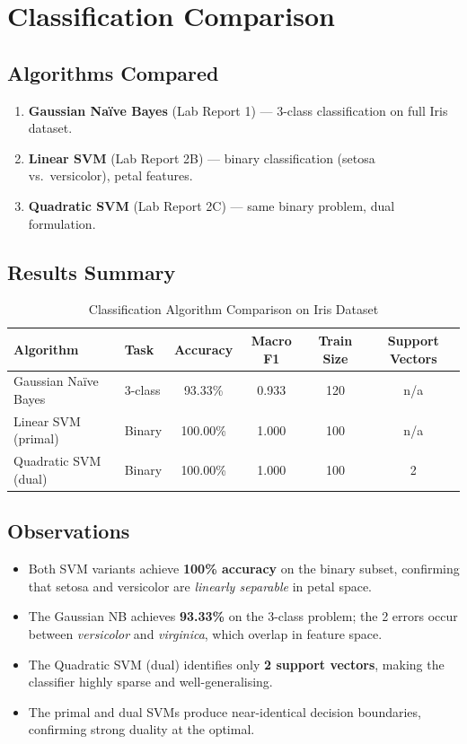 \documentclass[12pt,a4paper]{article}
\begin{document}
\section{Classification Comparison}

\subsection{Algorithms Compared}

\begin{enumerate}[label=\arabic*.]
  \item \textbf{Gaussian Naïve Bayes} (Lab Report 1) — 3-class classification on full Iris dataset.
  \item \textbf{Linear SVM} (Lab Report 2B) — binary classification (setosa vs.\ versicolor), petal features.
  \item \textbf{Quadratic SVM} (Lab Report 2C) — same binary problem, dual formulation.
\end{enumerate}

\subsection{Results Summary}

\begin{table}[H]
\centering
\caption{Classification Algorithm Comparison on Iris Dataset}
\begin{tabular}{l l c c c c}
\toprule
\textbf{Algorithm} & \textbf{Task} & \textbf{Accuracy} & \textbf{Macro F1} & \textbf{Train Size} & \textbf{Support Vectors} \\
\midrule
Gaussian Naïve Bayes & 3-class & 93.33\% & 0.933 & 120 & n/a \\
Linear SVM (primal)  & Binary  & 100.00\% & 1.000 & 100 & n/a \\
Quadratic SVM (dual) & Binary  & 100.00\% & 1.000 & 100 & 2   \\
\bottomrule
\end{tabular}
\end{table}

\subsection{Observations}

\begin{itemize}
  \item Both SVM variants achieve \textbf{100\% accuracy} on the binary subset, confirming that setosa and versicolor are \textit{linearly separable} in petal space.
  \item The Gaussian NB achieves \textbf{93.33\%} on the 3-class problem; the 2 errors occur between \textit{versicolor} and \textit{virginica}, which overlap in feature space.
  \item The Quadratic SVM (dual) identifies only \textbf{2 support vectors}, making the classifier highly sparse and well-generalising.
  \item The primal and dual SVMs produce near-identical decision boundaries, confirming strong duality at the optimal.
\end{itemize}
\end{document}
